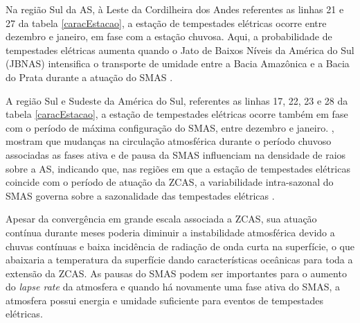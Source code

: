 
Na região Sul da AS, à Leste da Cordilheira dos Andes referentes as linhas  21 e 27 da tabela \ref{caracEstacao}, a estação de tempestades elétricas ocorre entre dezembro e janeiro, em fase com a estação chuvosa. Aqui, a probabilidade de tempestades elétricas aumenta quando o Jato de Baixos Níveis da América do Sul (JBNAS) intensifica o transporte de umidade entre a Bacia Amazônica e a Bacia do Prata durante a atuação do SMAS \cite{marengo2004}.   

A região Sul e Sudeste da América do Sul, referentes as linhas 17, 22, 23 e 28 da tabela \ref{caracEstacao}, a estação de tempestades elétricas ocorre também em fase com o período de máxima configuração do SMAS, entre dezembro e janeiro. , mostram que mudanças na circulação atmosférica durante o período chuvoso associadas as fases ativa e de pausa da SMAS influenciam na densidade de raios sobre a AS, indicando que, nas regiões em que a estação de tempestades elétricas coincide com o período de atuação da ZCAS, a variabilidade intra-sazonal do SMAS  governa sobre a sazonalidade das tempestades elétricas \cite{CarvalhoJones2002,carvalho2004south}.

Apesar da convergência em grande escala associada a ZCAS, sua atuação contínua durante meses poderia diminuir a instabilidade atmosférica devido a chuvas contínuas e baixa incidência de radiação de onda curta na superfície, o que abaixaria a temperatura da superfície dando características oceânicas para toda a extensão da ZCAS. As pausas do SMAS podem ser importantes para o aumento do \textit{lapse rate} da atmosfera e quando há novamente uma fase ativa do SMAS, a atmosfera possui energia e umidade suficiente para eventos de tempestades elétricas.



